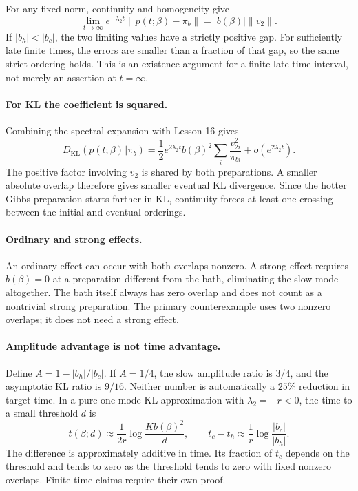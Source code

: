 For any fixed norm, continuity and homogeneity give
\[
\lim_{t\to\infty}e^{-\lambda_2t}\|p(t;\beta)-\pi_b\|
=|b(\beta)|\|v_2\|.
\]
If $|b_h|<|b_c|$, the two limiting values have a strictly positive gap.
For sufficiently late finite times, the errors are smaller than a fraction
of that gap, so the same strict ordering holds. This is an existence argument
for a finite late-time interval, not merely an assertion at $t=\infty$.

\paragraph{For KL the coefficient is squared.}
Combining the spectral expansion with Lesson 16 gives
\[
D_{\mathrm{KL}}(p(t;\beta)\Vert\pi_b)
=\frac12e^{2\lambda_2t}b(\beta)^2
\sum_i\frac{v_{2i}^2}{\pi_{bi}}+o(e^{2\lambda_2t}).
\]
The positive factor involving $v_2$ is shared by both preparations.
A smaller absolute overlap therefore gives smaller eventual KL divergence.
Since the hotter Gibbs preparation starts farther in KL, continuity forces
at least one crossing between the initial and eventual orderings.

\paragraph{Ordinary and strong effects.}
An ordinary effect can occur with both overlaps nonzero. A strong effect
requires $b(\beta)=0$ at a preparation different from the bath, eliminating
the slow mode altogether. The bath itself always has zero overlap and does
not count as a nontrivial strong preparation. The primary counterexample
uses two nonzero overlaps; it does not need a strong effect.

\paragraph{Amplitude advantage is not time advantage.}
Define $A=1-|b_h|/|b_c|$. If $A=1/4$, the slow amplitude ratio is $3/4$,
and the asymptotic KL ratio is $9/16$. Neither number is automatically a
$25\%$ reduction in target time. In a pure one-mode KL approximation with
$\lambda_2=-r<0$, the time to a small threshold $d$ is
\[
t(\beta;d)\approx\frac{1}{2r}
\log\frac{K b(\beta)^2}{d},
\qquad
 t_c-t_h\approx\frac1r\log\frac{|b_c|}{|b_h|}.
\]
The difference is approximately additive in time. Its fraction of $t_c$
depends on the threshold and tends to zero as the threshold tends to zero
with fixed nonzero overlaps. Finite-time claims require their own proof.

